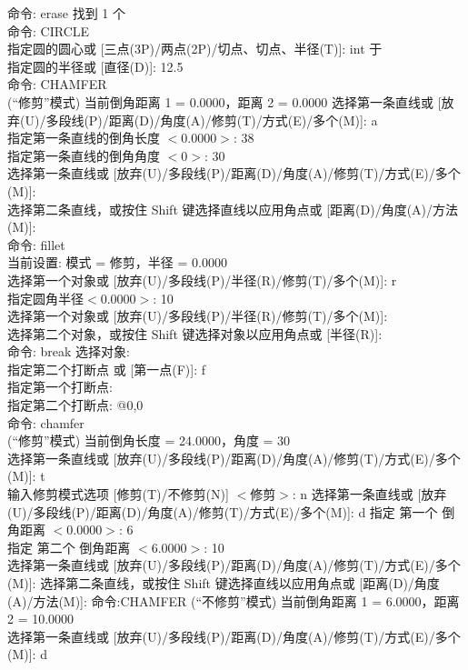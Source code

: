 命令: erase 找到 1 个\\
命令: CIRCLE\\
指定圆的圆心或 [三点(3P)/两点(2P)/切点、切点、半径(T)]: int 于\\
指定圆的半径或 [直径(D)]: 12.5\\
命令:  CHAMFER\\
(“修剪”模式) 当前倒角距离 1 = 0.0000，距离 2 = 0.0000
选择第一条直线或 [放弃(U)/多段线(P)/距离(D)/角度(A)/修剪(T)/方式(E)/多个(M)]:  a \\
指定第一条直线的倒角长度 $<$0.0000$>$: 38 \\
指定第一条直线的倒角角度 $<$0$>$: 30\\
选择第一条直线或 [放弃(U)/多段线(P)/距离(D)/角度(A)/修剪(T)/方式(E)/多个(M)]:\\
选择第二条直线，或按住 Shift 键选择直线以应用角点或 [距离(D)/角度(A)/方法(M)]:\\
命令: fillet\\
当前设置: 模式 = 修剪，半径 = 0.0000\\
选择第一个对象或 [放弃(U)/多段线(P)/半径(R)/修剪(T)/多个(M)]: r \\
指定圆角半径$<$0.0000$>$: 10\\
选择第一个对象或 [放弃(U)/多段线(P)/半径(R)/修剪(T)/多个(M)]:\\
选择第二个对象，或按住 Shift 键选择对象以应用角点或 [半径(R)]:\\
命令: break 选择对象:\\
指定第二个打断点 或 [第一点(F)]: f\\
指定第一个打断点:\\
指定第二个打断点: @0,0\\
命令: chamfer\\
(“修剪”模式) 当前倒角长度 = 24.0000，角度 = 30\\
选择第一条直线或 [放弃(U)/多段线(P)/距离(D)/角度(A)/修剪(T)/方式(E)/多个(M)]:  t\\
输入修剪模式选项 [修剪(T)/不修剪(N)] $<$修剪$>$: n
选择第一条直线或 [放弃(U)/多段线(P)/距离(D)/角度(A)/修剪(T)/方式(E)/多个(M)]:  d 指定 第一个 倒角距离 $<0.0000>$: 6\\
 指定 第二个 倒角距离 $<6.0000>$: 10\\
选择第一条直线或 [放弃(U)/多段线(P)/距离(D)/角度(A)/修剪(T)/方式(E)/多个(M)]:
选择第二条直线，或按住 Shift 键选择直线以应用角点或 [距离(D)/角度(A)/方法(M)]:
命令:CHAMFER
(“不修剪”模式) 当前倒角距离 1 = 6.0000，距离 2 = 10.0000\\
选择第一条直线或 [放弃(U)/多段线(P)/距离(D)/角度(A)/修剪(T)/方式(E)/多个(M)]:  d \\
